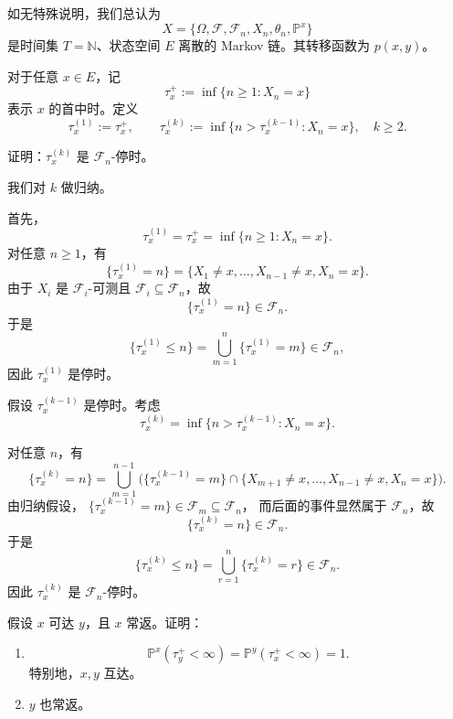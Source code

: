 \documentclass{ctexart}
\newif\ifpreface
\begin{document}
\large
\setlength{\baselineskip}{1.2em}
\ifpreface

\newgeometry{left=2cm,right=2cm,top=2cm,bottom=2cm}
\else
{}
\maketitle
\fi
如无特殊说明，我们总认为
\[
  X=\{\Omega,\mathscr{F},\mathscr{F}_n,X_n,\theta_n,\mathbb P^x\}
\]
是时间集 \(T=\mathbb N\)、状态空间 \(E\) 离散的 Markov 链。其转移函数为
\(p(x,y)\)。

对于任意 \(x\in E\)，记
\[
  \tau_x^+ := \inf\{n\ge 1:X_n=x\}
\]
表示 \(x\) 的首中时。定义
\[
  \tau_x^{(1)}:=\tau_x^+,
  \qquad
  \tau_x^{(k)}
  :=
  \inf\{n>\tau_x^{(k-1)}:X_n=x\},
  \quad k\ge2.
\]

\begin{problem}
  证明：\(\tau_x^{(k)}\) 是 \(\mathscr F_n\)-停时。
\end{problem}

\begin{solution}

  我们对 \(k\) 做归纳。

  首先，
  \[
    \tau_x^{(1)}
    =
    \tau_x^+
    =
    \inf\{n\ge1:X_n=x\}.
  \]
  对任意 \(n\ge1\)，有
  \[
    \{\tau_x^{(1)}=n\}
    =
    \{X_1\neq x,\dots,X_{n-1}\neq x,X_n=x\}.
  \]
  由于 \(X_i\) 是 \(\mathscr F_i\)-可测且
  \(\mathscr F_i\subseteq\mathscr F_n\)，故
  \[
    \{\tau_x^{(1)}=n\}\in\mathscr F_n.
  \]
  于是
  \[
    \{\tau_x^{(1)}\le n\}
    =
    \bigcup_{m=1}^n
    \{\tau_x^{(1)}=m\}
    \in\mathscr F_n,
  \]
  因此 \(\tau_x^{(1)}\) 是停时。

  假设 \(\tau_x^{(k-1)}\) 是停时。考虑
  \[
    \tau_x^{(k)}
    =
    \inf\{n>\tau_x^{(k-1)}:X_n=x\}.
  \]

  对任意 \(n\)，有
  \[
    \{\tau_x^{(k)}=n\}
    =
    \bigcup_{m=1}^{n-1}
    \Big(
      \{\tau_x^{(k-1)}=m\}
      \cap
      \{X_{m+1}\neq x,\dots,X_{n-1}\neq x,X_n=x\}
    \Big).
  \]
  由归纳假设，
  \(\{\tau_x^{(k-1)}=m\}\in\mathscr F_m\subseteq\mathscr F_n\)，
  而后面的事件显然属于 \(\mathscr F_n\)，故
  \[
    \{\tau_x^{(k)}=n\}\in\mathscr F_n.
  \]
  于是
  \[
    \{\tau_x^{(k)}\le n\}
    =
    \bigcup_{r=1}^n
    \{\tau_x^{(k)}=r\}
    \in\mathscr F_n.
  \]
  因此 \(\tau_x^{(k)}\) 是 \(\mathscr F_n\)-停时。

\end{solution}

\begin{problem}\label{pro:1}
  假设 \(x\) 可达 \(y\)，且 \(x\) 常返。证明：

  \begin{enumerate}[label=(\arabic*)]
    \item
      \[
        \mathbb P^x(\tau_y^+<\infty)
        =
        \mathbb P^y(\tau_x^+<\infty)
        =
        1.
      \]
      特别地，\(x,y\) 互达。

    \item
      \(y\) 也常返。
  \end{enumerate}
\end{problem}
\end{document}
